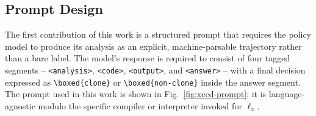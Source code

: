 \subsection{Prompt Design}
\label{subsec:prompt_design}

The first contribution of this work is a structured prompt that requires the
policy model to produce its analysis as an explicit, machine-parsable
trajectory rather than a bare label. The model's response is required to
consist of four tagged segments -- \texttt{<analysis>}, \texttt{<code>},
\texttt{<output>}, and \texttt{<answer>} -- with a final decision expressed
as \verb|\boxed{clone}| or \verb|\boxed{non-clone}| inside the answer segment.
The prompt used in this work is shown in
Fig.~\ref{fig:xccd-prompt}; it is language-agnostic modulo the specific
compiler or interpreter invoked for $\ell_x$.

